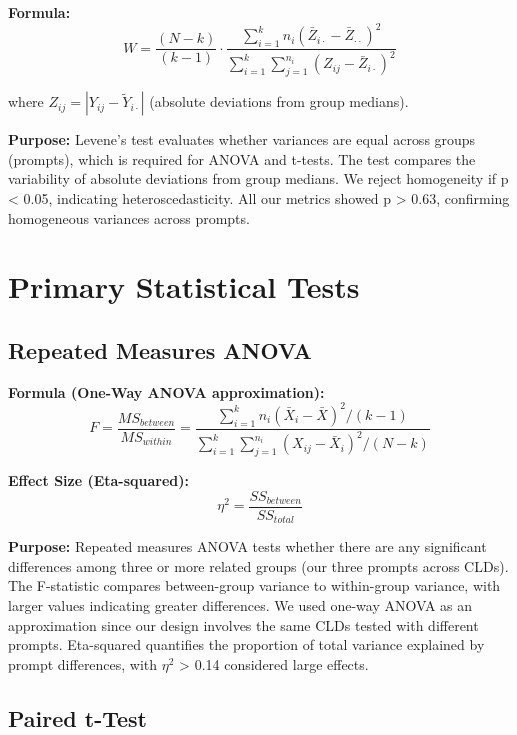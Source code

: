 \textbf{Formula:}
\begin{equation}
W = \frac{(N-k)}{(k-1)} \cdot \frac{\sum_{i=1}^{k} n_i(\bar{Z}_{i\cdot} - \bar{Z}_{\cdot\cdot})^2}{\sum_{i=1}^{k}\sum_{j=1}^{n_i}(Z_{ij} - \bar{Z}_{i\cdot})^2}
\end{equation}

where $Z_{ij} = |Y_{ij} - \tilde{Y}_{i\cdot}|$ (absolute deviations from group medians).

\textbf{Purpose:} Levene's test evaluates whether variances are equal across groups (prompts), which is required for ANOVA and t-tests. The test compares the variability of absolute deviations from group medians. We reject homogeneity if p < 0.05, indicating heteroscedasticity. All our metrics showed p > 0.63, confirming homogeneous variances across prompts.

\section{Primary Statistical Tests}

\subsection{Repeated Measures ANOVA}

\textbf{Formula (One-Way ANOVA approximation):}
\begin{equation}
F = \frac{MS_{between}}{MS_{within}} = \frac{\sum_{i=1}^{k} n_i(\bar{X}_{i} - \bar{X})^2/(k-1)}{\sum_{i=1}^{k}\sum_{j=1}^{n_i}(X_{ij} - \bar{X}_i)^2/(N-k)}
\end{equation}

\textbf{Effect Size (Eta-squared):}
\begin{equation}
\eta^2 = \frac{SS_{between}}{SS_{total}}
\end{equation}

\textbf{Purpose:} Repeated measures ANOVA tests whether there are any significant differences among three or more related groups (our three prompts across CLDs). The F-statistic compares between-group variance to within-group variance, with larger values indicating greater differences. We used one-way ANOVA as an approximation since our design involves the same CLDs tested with different prompts. Eta-squared quantifies the proportion of total variance explained by prompt differences, with $\eta^2$ > 0.14 considered large effects.

\subsection{Paired t-Test}

